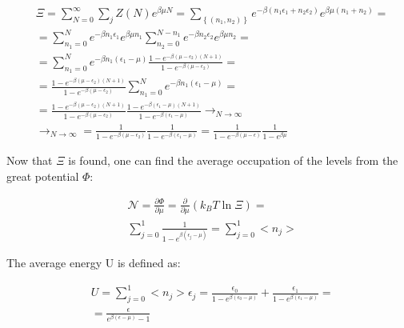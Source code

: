 \documentclass{article}
\begin{document}
\begin{equation}
    \begin{aligned}
         & \Xi=\sum_{N=0}^{\infty}\sum_{j}Z(N)e^{\beta\mu N}=\sum_{\left\{ (n_1,n_2) \right\}} e^{-\beta(n_1\epsilon_1+n_2\epsilon_2)}e^{\beta\mu(n_1+n_2)}=                             \\
         & =\sum_{n_1=0}^{N}e^{-\beta n_1\epsilon_1}e^{\beta\mu n_1}\sum_{n_2=0}^{N-n_1}e^{-\beta n_2\epsilon_2}e^{\beta\mu n_2}=                                                        \\
         & =\sum_{n_1=0}^{N}e^{-\beta n_1 (\epsilon_1-\mu)}\frac{1-e^{-\beta(\mu-\epsilon_2)(N+1)}}{1-e^{-\beta(\mu-\epsilon_2)}}=                                                       \\
         & =\frac{1-e^{-\beta(\mu-\epsilon_2)(N+1)}}{1-e^{-\beta(\mu-\epsilon_2)}}\sum_{n_1=0}^{N}e^{-\beta n_1 (\epsilon_1-\mu)}=                                                       \\
         & =\frac{1-e^{-\beta(\mu-\epsilon_2)(N+1)}}{1-e^{-\beta(\mu-\epsilon_2)}}\frac{1-e^{-\beta(\epsilon_1-\mu)(N+1)}}{1-e^{-\beta(\epsilon_1-\mu)}}\rightarrow_{N\rightarrow\infty} \\
         & \rightarrow_{N\rightarrow\infty}=\frac{1}{1-e^{-\beta(\mu-\epsilon_2)}}\frac{1}{1-e^{-\beta(\epsilon_1-\mu)}}= \frac{1}{1-e^{-\beta(\mu-\epsilon)}}\frac{1}{1-e^{\beta\mu}}
    \end{aligned}
\end{equation}

Now that $\Xi$ is found, one can find the average occupation of the levels from the great potential $\Phi$:

\begin{equation}
    \begin{aligned}
         & \mathcal{N}= \frac{\partial \Phi}{\partial \mu}= \frac{\partial}{\partial \mu}\left(k_B T \ln{\Xi}\right)= \\
         & \sum_{j=0}^{1}\frac{1}{1-e^{\beta(\epsilon_j-\mu)}}= \sum_{j=0}^{1} <n_j>
    \end{aligned}
\end{equation}

The average energy U is defined as:

\begin{equation}
    \begin{aligned}
         & U=\sum_{j=0}^{1} <n_j>\epsilon_j= \frac{\epsilon_0}{1-e^{\beta(\epsilon_0-\mu)}}+\frac{\epsilon_1}{1-e^{\beta(\epsilon_1-\mu)}}= \\
         & =\frac{\epsilon}{e^{\beta(\epsilon-\mu)}-1}
    \end{aligned}
\end{equation}
\end{document}
